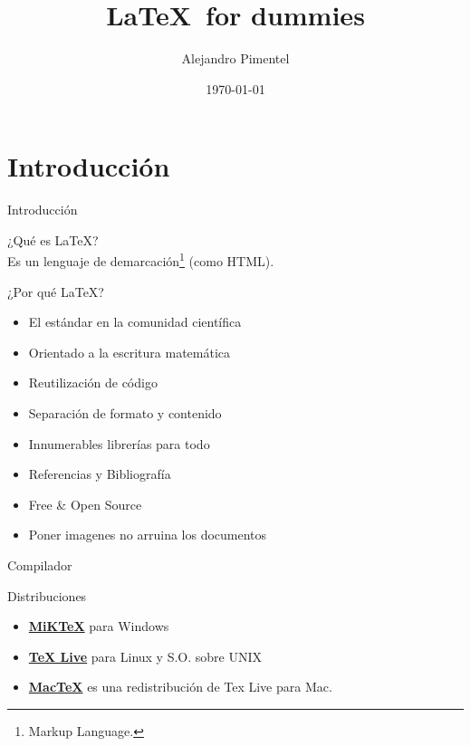 \documentclass[10pt,handout]{beamer}
\title[\LaTeX\hspace{2em}]{\LaTeX\ for dummies}
\author[A. Pimentel]{Alejandro Pimentel}
\date{\today}
\institute{Pontificia Universidad Católica de Chile}
\begin{document}
\maketitle

\section{Introducción}

\begin{frame}{Introducción}
  \begin{center}
    {\Large ¿Qué es \LaTeX?} \\ \pause
    \vfill
    Es un lenguaje de demarcación\footnote{Markup Language.} (como HTML).
  \end{center}
\end{frame}

\begin{frame}{¿Por qué \LaTeX?}
	\begin{itemize}
    \item El estándar en la comunidad científica\pause
    \item Orientado a la escritura matemática\pause
    \item Reutilización de código\pause
    \item Separación de formato y contenido\pause
    \item Innumerables librerías para todo\pause
    \item Referencias y Bibliografía\pause
    \item Free \& Open Source\pause
    \item Poner imagenes no arruina los documentos
	\end{itemize}
\end{frame}

\begin{frame}{Compilador}
  \begin{block}{Distribuciones}
    \begin{itemize}
      \item \href{http://miktex.org}\textbf{MiKTeX} para Windows
      \item \href{https://www.tug.org/texlive/}\textbf{TeX Live} para Linux y S.O. sobre UNIX
      \item \href{https://tug.org/mactex/}\textbf{MacTeX} es una redistribución de Tex Live para Mac.
    \end{itemize}
  \end{block}
\end{frame}
\end{document}
